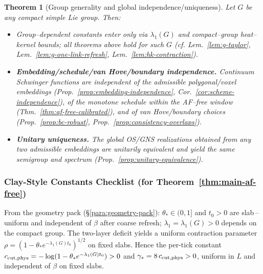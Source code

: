 \documentclass[11pt]{amsart}
\theoremstyle{plain}
\newtheorem{theorem}{Theorem}[section]
\theoremstyle{definition}
\theoremstyle{remark}
\begin{document}
\begin{theorem}[Group generality and global independence/uniqueness]\label{thm:independence-clay}
Let $G$ be any compact simple Lie group. Then:
\begin{itemize}
  \item Group–dependent constants enter only via $\lambda_1(G)$ and compact–group heat–kernel bounds; all theorems above hold for such $G$ (cf. Lem.~\ref{lem:g-taylor}, Lem.~\ref{lem:g-one-link-refresh}, Lem.~\ref{lem:hk-contraction}).
  \item \textbf{Embedding/schedule/van Hove/boundary independence.} Continuum Schwinger functions are independent of the admissible polygonal/voxel embeddings (Prop.~\ref{prop:embedding-independence}, Cor.~\ref{cor:scheme-independence}), of the monotone schedule within the AF–free window (Thm.~\ref{thm:af-free-calibrated}), and of van Hove/boundary choices (Prop.~\ref{prop:bc-robust}, Prop.~\ref{prop:consistency-overlaps}).
  \item \textbf{Unitary uniqueness.} The global OS/GNS realizations obtained from any two admissible embeddings are unitarily equivalent and yield the same semigroup and spectrum (Prop.~\ref{prop:unitary-equivalence}).
\end{itemize}
\end{theorem}

\begin{mdframed}[linewidth=0.5pt, linecolor=orange!50, backgroundcolor=orange!5, roundcorner=2pt, innertopmargin=8pt, innerbottommargin=8pt, skipabove=10pt, skipbelow=10pt]
\subsubsection*{Clay-Style Constants Checklist (for Theorem~\ref{thm:main-af-free})}
From the geometry pack (\S\ref{para:geometry-pack}): $\theta_*\in(0,1]$ and $t_0>0$ are slab\,–\,uniform and independent of $\beta$ after coarse refresh; $\lambda_1=\lambda_1(G)>0$ depends on the compact group. The two-layer deficit yields a uniform contraction parameter $\rho=(1-\theta_* e^{-\lambda_1(G) t_0})^{1/2}$ on fixed slabs. Hence the per-tick constant $c_{\rm cut,phys}=-\log(1-\theta_* e^{-\lambda_1(G) t_0})>0$ and $\gamma_*=8\,c_{\rm cut,phys}>0$, uniform in $L$ and independent of $\beta$ on fixed slabs.
\end{mdframed}
\end{document}
